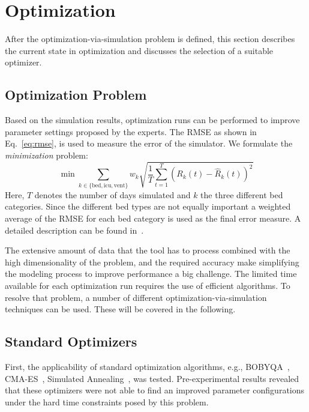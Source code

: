 \documentclass[conference]{IEEEtran}
\begin{document}
\section{Optimization}\label{sec:optim}
After the optimization-via-simulation problem is defined, this section describes the current state in optimization and discusses the selection of a suitable optimizer. 

\subsection{Optimization Problem}
Based on the simulation results, optimization runs can be performed to improve parameter settings proposed by the experts. 
The \gls{RMSE} as shown in Eq.~\ref{eq:rmse}, is used to measure the error of the simulator.
We formulate the \emph{minimization} problem:
\begin{equation}\label{eq:rmse}
  \min 
  \sum_{k\in\{\text{bed},\text{icu},\text{vent}\}}
    w_k  \sqrt{\frac{1}{T} \sum_{t=1}^T \left(R_k(t) - \hat{R}_k(t)\right)^2}
\end{equation}
Here, $T$ denotes the number of days simulated and $k$ the three different bed categories.
Since the different bed types are not equally important a weighted average of the \gls{RMSE} for each bed category is used as the final error measure.
A detailed description can be found in~\cite{Anon21a}.

The extensive amount of data that the tool has to process combined with the high dimensionality of the problem, and the required accuracy make simplifying the modeling process to improve performance a big challenge.
The limited time available for each optimization run requires the use of efficient algorithms.
To resolve that problem, a number of different optimization-via-simulation techniques can be used. 
These will be covered in the following.

\subsection{Standard Optimizers}
First, the applicability of standard optimization algorithms, e.g., BOBYQA~\citep{Powe09a}, CMA-ES~\citep{Hans06a}, Simulated Annealing~\citep{vanL87a}, was tested. Pre-experimental results revealed that these optimizers were not able to find an improved parameter configurations under the hard time constraints posed by this problem. 
\end{document}
